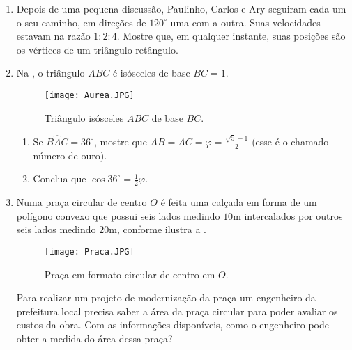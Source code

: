 \begin{enumerate}
\item{}
Depois de  uma pequena discussão, Paulinho, Carlos e Ary seguiram cada um o seu caminho, em direções de $120^\circ$ uma com a outra. Suas velocidades estavam na razão $1:2:4$. Mostre que, em qualquer instante, suas posições são os vértices de um triângulo retângulo.

\item{}
Na , o triângulo $ABC$ é isósceles de base $BC=1$. 
\begin{figure}[H]
    \centering
    \texttt{[image: Aurea.JPG]}
    \caption{Triângulo isósceles $ABC$ de base $BC$.}
    \label{Aurea}
\end{figure}
\begin{enumerate}
    \item Se $B\hat{A}C=36^\circ$, mostre que $AB=AC=\varphi=\frac{\sqrt{5}+1}{2}$ (esse é o chamado número de ouro).
    \item Conclua que $\cos36^\circ=\frac{1}{2}\varphi$.
\end{enumerate}

\item{}
Numa praça circular de centro $O$ é feita uma calçada em forma de um polígono convexo que possui seis lados medindo $10$m intercalados por outros seis lados medindo $20$m, conforme ilustra a .
\begin{figure}[H]
    \centering
    \texttt{[image: Praca.JPG]}
    \caption{Praça em formato circular de centro em $O$.}
    \label{Praca}
\end{figure}
Para realizar um projeto de modernização da praça um engenheiro da prefeitura local precisa saber a área da praça circular para poder avaliar os custos da obra. Com as informações disponíveis, como o engenheiro pode obter a medida do área dessa praça?
\end{enumerate}





\ifnum{}
\clearpage
\else
\notasfinais
\fi




\nocite{*}

